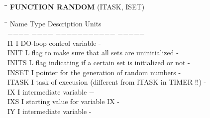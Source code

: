 \documentclass[11pt]{article}
\begin{document}
\bigskip
\nwln
\begin{tabbing}
\hspace{1.27cm}\=\hspace{1.27cm}\=\hspace{1.27cm}\=\hspace{1.27cm}\=%
\hspace{1.27cm}\=\hspace{1.27cm}\=\hspace{1.27cm}\=\hspace{1.27cm}\=%
\hspace{1.27cm}\=\hspace{1.27cm}\=\kill
{\bf FUNCTION RANDOM}\> \> \> (ITASK, ISET)
\end{tabbing}
\nwln
\begin{tabbing}
\hspace{1.27cm}\=\hspace{1.27cm}\=\hspace{1.27cm}\=\hspace{1.27cm}\=%
\hspace{1.27cm}\=\hspace{1.27cm}\=\hspace{1.27cm}\=\hspace{1.27cm}\=%
\hspace{1.27cm}\=\hspace{1.27cm}\=\kill
Name    \> \> Type   \> Description                                        \> \> \> \> \> \> \> Units\\
$-$$-$$-$$-$    \> \> $-$$-$$-$$-$   \> $-$$-$$-$$-$$-$$-$$-$$-$$-$$-$$-$                                        \> \> \> \> \> \> \> $-$$-$$-$$-$$-$\\
I1\> \> I\> DO-loop control variable\> \> \> \> \> \> \> -\\
INIT\> \> L\> flag to make sure that all sets are uninitialized\> \> \> \> \> \> \> -\\
INITS\> \> L\> flag indicating if a certain set is initialized or not\> \> \> \> \> \> \> -\\
INSET\> \> I\> pointer for the generation of random numbers\> \> \> \> \> \> \> -\\
ITASK\> \> I\> task of execusion (different from ITASK in TIMER !!)\> \> \> \> \> \> \> -\\
IX      \> \> I   \> intermediate variable                              \> \> \> \> \> \> \> $-$\\
IXS\> \> I\> starting value for variable IX\> \> \> \> \> \> \> -\\
IY      \> \> I   \> intermediate variable         \> \> \> \> \> \> \> -\\

\end{tabbing}
\end{document}
